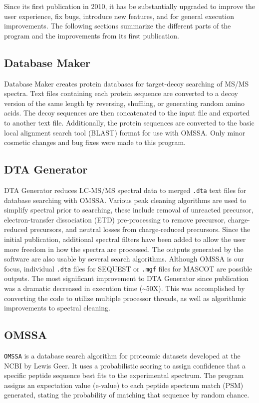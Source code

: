 Since its first publication in 2010, it has be substantially upgraded to improve the user experience, fix bugs, introduce new features, and for general execution improvements. The following sections summarize the different parts of the \compass{} program and the improvements from its first publication. 
 

\subsection*{Database Maker}
Database Maker creates protein databases for target-decoy searching of MS/MS spectra. Text files containing each protein sequence are converted to a decoy version of the same length by reversing, shuffling, or generating random amino acids. The decoy sequences are then concatenated to the input file and exported to another text file. Additionally, the protein sequences are converted to the basic local alignment search tool (BLAST) format for use with OMSSA. Only minor cosmetic changes and bug fixes were made to this program.

\subsection*{DTA Generator}
DTA Generator reduces LC-MS/MS spectral data to merged \texttt{.dta} text files for database searching with OMSSA. Various peak cleaning algorithms are used to simplify spectral prior to searching, these include removal of unreacted precursor, electron-transfer dissociation (ETD) pre-processing to remove precursor, charge-reduced precursors, and neutral losses from charge-reduced precursors. Since the initial publication, additional spectral filters have been added to allow the user more freedom in how the spectra are processed. The outputs generated by the software are also usable by several search algorithms. Although OMSSA is our focus, individual \texttt{.dta} files for SEQUEST or \texttt{.mgf} files for MASCOT are possible outputs. The most significant improvement to DTA Generator since publication was a dramatic decreased in execution time (\textasciitilde50X). This was accomplished by converting the code to utilize multiple processor threads, as well as algorithmic improvements to spectral cleaning. 

\subsection*{OMSSA}
\texttt{OMSSA} is a database search algorithm for proteomic datasets developed at the NCBI by Lewis Geer. It uses a probabilistic scoring to assign confidence that a specific peptide sequence best fits to the experimental spectrum. The program assigns an expectation value (e-value) to each peptide spectrum match (PSM) generated, stating the probability of matching that sequence by random chance. 

